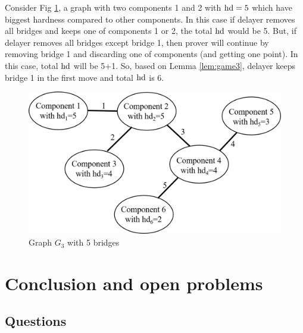 \documentclass[]{book}
\begin{document}
\begin{examp}\label{exp:hd6}
       Consider Fig \ref{fig:hd6}, a graph with two components 1 and 2 with $\operatorname{hd}=5$ which have biggest hardness compared
	   to other components. In this case if delayer removes all bridges and keeps one of components 1 or 2, the total $\operatorname{hd}$ 
	   would be 5. But, if delayer removes all bridges except bridge 1, then prover will continue by removing bridge 1 and discarding 
	   one of components (and getting one point). In this case, total $\operatorname{hd}$ will be 5+1. So, based on Lemma \ref{lem:game3}, 
	   delayer keeps bridge 1 in the first move and total $\operatorname{hd}$ is 6.
	  \begin{figure}
      \begin{center}
      \includegraphics[scale =0.65]{graph_with_bridges2.png}
      \caption{Graph $G_3$ with 5 bridges}
	  \label{fig:hd6}
      \end{center}
      \end{figure}
\end{examp}


\chapter{Conclusion and open problems}
\label{cha:concl}

\section{Questions}
\label{sec:Questions}
\end{document}
